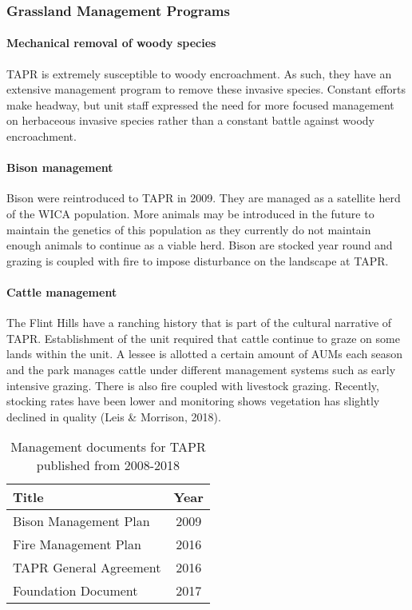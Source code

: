 \subsubsection{Grassland Management Programs}

\paragraph{Mechanical removal of woody species} 
TAPR is extremely susceptible to woody encroachment. 
As such, they have an extensive management program to remove these invasive species. 
Constant efforts make headway, but unit staff expressed the need for more focused management on herbaceous invasive species rather than a constant battle against woody encroachment.

\paragraph{Bison management} 
Bison were reintroduced to TAPR in 2009. 
They are managed as a satellite herd of the WICA population. 
More animals may be introduced in the future to maintain the genetics of this population as they currently do not maintain enough animals to continue as a viable herd. 
Bison are stocked year round and grazing is coupled with fire to impose disturbance on the landscape at TAPR.

\paragraph{Cattle management} 
The Flint Hills have a ranching history that is part of the cultural narrative of TAPR. 
Establishment of the unit required that cattle continue to graze on some lands within the unit. 
A lessee is allotted a certain amount of AUMs each season and the park manages cattle under different management systems such as early intensive grazing.
There is also fire coupled with livestock grazing.
Recently, stocking rates have been lower and monitoring shows vegetation has slightly declined in quality (Leis \& Morrison, 2018).

\begin{table}[h]
	\centering
\caption[TAPR management documents]
	{Management documents for TAPR published from 2008-2018}
\label{tab:TAPRmandocs}
\begin{tabular}{lc}
		\toprule
		Title & Year\tabularnewline
		\midrule
Bison Management Plan & 2009 \tabularnewline
Fire Management Plan & 2016 \tabularnewline
TAPR General Agreement & 2016 \tabularnewline
Foundation Document & 2017 \tabularnewline
\bottomrule
\end{tabular}
\end{table}

